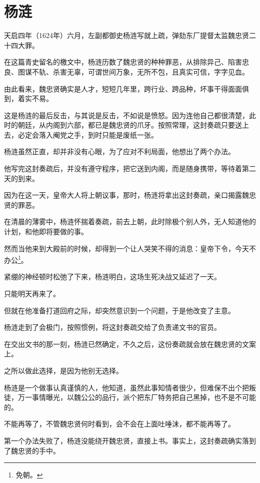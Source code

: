 \section{杨涟}
\ifnum{}
	\begin{multicols}{\theparacolNo}
		\fi
		天启四年（1624年）六月，左副都御史杨涟写就上疏，弹劾东厂提督太监魏忠贤二十四大罪。

		在这篇青史留名的檄文中，杨涟历数了魏忠贤的种种罪恶，从排除异己、陷害忠良、图谋不轨、杀害无辜，可谓世间万象，无所不包，且真实可信，字字见血。

		由此看来，魏忠贤确实是人才，短短几年里，跨行业、跨品种，坏事干得面面俱到，着实不易。

		这是杨涟的最后反击，与其说是反击，不如说是愤怒。因为连他自己都很清楚，此时的朝廷，从内阁到六部，都已是魏忠贤的爪牙。按照常理，这封奏疏只要送上去，必定会落入阉党之手，到时只能是废纸一张。

		杨涟虽然正直，却并非没有心眼，为了应对不利局面，他想出了两个办法。

		他写完这封奏疏后，并没有遵守程序，把它送到内阁，而是随身携带，等待着第二天的到来。

		因为在这一天，皇帝大人将上朝议事，那时，杨涟将拿出这封奏疏，亲口揭露魏忠贤的罪恶。

		在清晨的薄雾中，杨涟怀揣着奏疏，前去上朝，此时除极个别人外，无人知道他的计划，和他即将要做的事。

		然而当他来到大殿前的时候，却得到一个让人哭笑不得的消息：皇帝下令，今天不办公\footnote{免朝。}。

		紧绷的神经顿时松弛了下来，杨涟明白，这场生死决战又延迟了一天。

		只能明天再来了。

		但就在他准备打道回府之际，却突然意识到一个问题，于是他改变了主意。

		杨涟走到了会极门，按照惯例，将这封奏疏交给了负责递文书的官员。

		在交出文书的那一刻，杨涟已然确定，不久之后，这份奏疏就会放在魏忠贤的文案上。

		之所以做此选择，是因为他别无选择。

		杨涟是一个做事认真谨慎的人，他知道，虽然此事知情者很少，但难保不出个把叛徒，万一事情曝光，以魏公公的品行，派个把东厂特务把自己黑掉，也不是不可能的。

		不能再等了，不管魏忠贤何时看到，会不会在上面吐唾沫，都不能再等了。

		第一个办法失败了，杨涟没能绕开魏忠贤，直接上书。事实上，这封奏疏确实落到了魏忠贤的手中。


\end{multicols}
